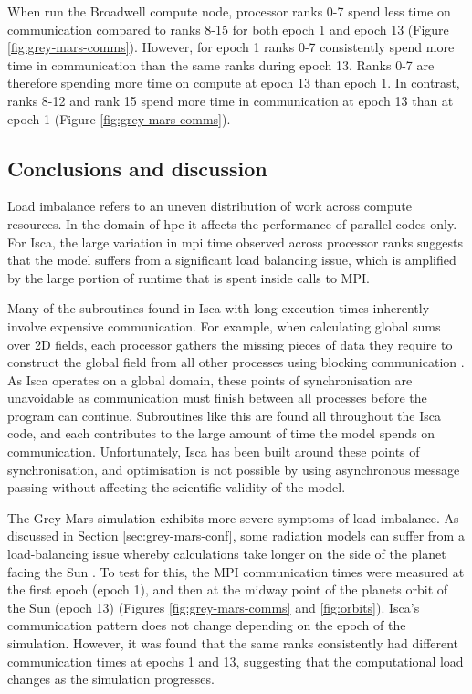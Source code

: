 \documentclass[a4paper,11pt]{report}
\begin{document}
\par
When run the Broadwell compute node, processor ranks 0-7 spend less time on communication compared to ranks 8-15 for both epoch 1 and epoch 13 (Figure \ref{fig:grey-mars-comms}). However, for epoch 1 ranks 0-7 consistently spend more time in communication than the same ranks during epoch 13. Ranks 0-7 are therefore spending more time on compute at epoch 13 than epoch 1. In contrast, ranks 8-12 and rank 15 spend more time in communication at epoch 13 than at epoch 1 (Figure \ref{fig:grey-mars-comms}). 






\subsection{Conclusions and discussion}
Load imbalance refers to an uneven distribution of work across compute resources. In the domain of \gls{hpc} it affects the performance of parallel codes only. For Isca, the large variation in \gls{mpi} time observed across processor ranks suggests that the model suffers from a significant load balancing issue, which is amplified by the large portion of runtime that is spent inside calls to MPI.
\par
Many of the subroutines found in Isca with long execution times inherently involve expensive communication. For example, when calculating global sums over 2D fields, each processor gathers the missing pieces of data they require to construct the global field from all other processes using blocking communication \cite{schmidt2007benchmark}. As Isca operates on a global domain, these points of synchronisation are unavoidable as communication must finish between all processes before the program can continue. Subroutines like this are found all throughout the Isca code, and each contributes to the large amount of time the model spends on communication. Unfortunately, Isca has been built around these points of synchronisation, and optimisation is not possible by using asynchronous message passing without affecting the scientific validity of the model. 
\par
The Grey-Mars simulation exhibits more severe symptoms of load imbalance. As discussed in Section \ref{sec:grey-mars-conf}, some radiation models can suffer from a load-balancing issue whereby calculations take longer on the side of the planet facing the Sun \cite{foster1994load}. To test for this, the MPI communication times were measured at the first epoch (epoch 1), and then at the midway point of the planets orbit of the Sun (epoch 13) (Figures \ref{fig:grey-mars-comms} and \ref{fig:orbits}). Isca's communication pattern does not change depending on the epoch of the simulation. However, it was found that the same ranks consistently had different communication times at epochs 1 and 13, suggesting that the computational load changes as the simulation progresses. 
\end{document}
